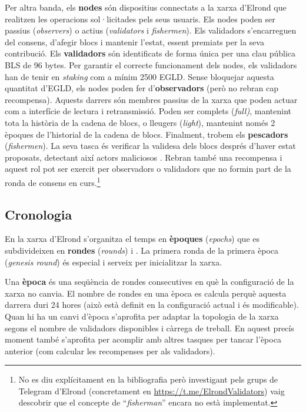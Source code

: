 \documentclass[11pt,a4paper]{article}
\begin{document}
Per altra banda, els \textbf{nodes} són dispositius connectats a la xarxa d'Elrond que realitzen les operacions sol·licitades pels seus usuaris. Els nodes poden ser passius (\textit{observers}) o actius (\textit{validators} i \textit{fishermen}). Els validadors s'encarreguen del consens, d'afegir blocs i mantenir l'estat, essent premiats per la seva contribució. Els \textbf{validadors} són identificats de forma única per una clau pública BLS de 96 bytes. Per garantir el correcte funcionament dels nodes, els validadors han de tenir en \textit{staking} com a mínim 2500 EGLD. Sense bloquejar aquesta quantitat d'EGLD, els nodes poden fer d'\textbf{observadors} (però no rebran cap recompensa). Aquests darrers són membres passius de la xarxa que poden actuar com a interfície de lectura i retransmissió. Poden ser complets (\textit{full)}, mantenint tota la història de la cadena de blocs, o lleugers (\textit{light}), mantenint només 2 èpoques de l'historial de la cadena de blocs. Finalment, trobem els \textbf{pescadors} (\textit{fishermen}). La seva tasca és verificar la validesa dels blocs després d'haver estat proposats, detectant així actors maliciosos \cite{elrond2022-2}. Rebran també una recompensa i aquest rol pot ser exercit per observadors o validadors que no formin part de la ronda de consens en curs.\footnote{No es diu explícitament en la bibliografia però investigant pels grups de Telegram d'Elrond (concretament en \url{https://t.me/ElrondValidators}) vaig descobrir que el concepte de ``\textit{fisherman}'' encara no està implementat.}

\subsection{Cronologia}
En la xarxa d'Elrond s'organitza el temps en \textbf{èpoques} (\textit{epochs}) que es subdivideixen en \textbf{rondes} (\textit{rounds}) i \cite{elrond2022}. La primera ronda de la primera època (\textit{genesis round}) és especial i serveix per inicialitzar la xarxa.

Una \textbf{època} és una seqüència de rondes consecutives en què la configuració de la xarxa no canvia. El nombre de rondes en una època es calcula perquè aquesta darrera duri 24 hores (això està definit en la configuració actual i és modificable). Quan hi ha un canvi d'època s'aprofita per adaptar la topologia de la xarxa segons el nombre de validadors disponibles i càrrega de treball. En aquest precís moment també s'aprofita per acomplir amb altres tasques per tancar l'època anterior (com calcular les recompenses per als validadors).
\end{document}
